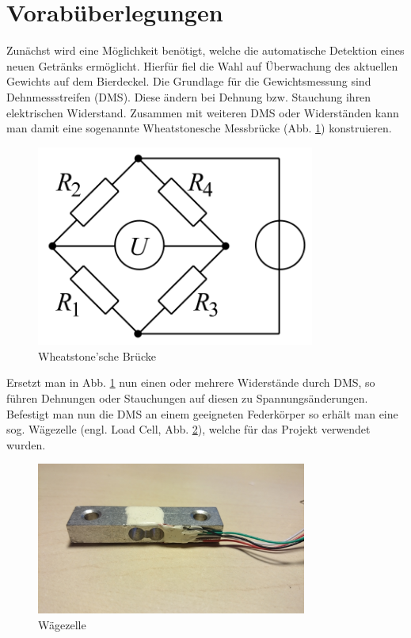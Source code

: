 \documentclass[12pt,journal]{IEEEtran}
\begin{document}
\section{Vorabüberlegungen}
Zunächst wird eine Möglichkeit benötigt, welche die automatische Detektion eines neuen Getränks ermöglicht.
Hierfür fiel die Wahl auf Überwachung des aktuellen Gewichts auf dem Bierdeckel.
Die Grundlage für die Gewichtsmessung sind Dehnmessstreifen (DMS).
Diese ändern bei Dehnung bzw. Stauchung ihren elektrischen Widerstand.
Zusammen mit weiteren DMS oder Widerständen kann man damit eine sogenannte Wheatstonesche Messbrücke (Abb. \ref{fig_wheatstone}) konstruieren.
\begin{figure}[!h]
  \centering
    \includegraphics[width=3.6in]{images/wheatstone.png}
    \caption{Wheatstone'sche Brücke}
  \label{fig_wheatstone}
\end{figure}
Ersetzt man in Abb. \ref{fig_wheatstone} nun einen oder mehrere Widerstände durch DMS, so führen Dehnungen oder Stauchungen auf diesen zu Spannungsänderungen.
Befestigt man nun die DMS an einem geeigneten Federkörper so erhält man eine sog. Wägezelle (engl. Load Cell, Abb. \ref{fig_loadcell}), welche für das Projekt verwendet wurden.
\begin{figure}[!h]
  \centering
    \includegraphics[width=3.5in]{images/loadcell.jpg}
    \caption{Wägezelle}
  \label{fig_loadcell}
\end{figure}
\end{document}
